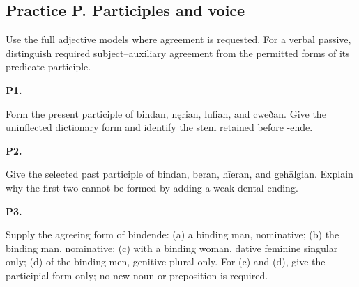 \subsection*{Practice P. Participles and voice}

Use the full adjective models where agreement is requested. For a verbal passive, distinguish required subject–auxiliary agreement from the permitted forms of its predicate participle.

\par\begin{minipage}{\linewidth}\raggedright
\textbf{P1.}

Form the present participle of bindan, nęrian, lufian, and cweðan. Give the uninflected dictionary form and identify the stem retained before -ende.

\end{minipage}\par\addvspace{4pt}

\par\begin{minipage}{\linewidth}\raggedright
\textbf{P2.}

Give the selected past participle of bindan, beran, hīeran, and gehālgian. Explain why the first two cannot be formed by adding a weak dental ending.

\end{minipage}\par\addvspace{4pt}

\par\begin{minipage}{\linewidth}\raggedright
\textbf{P3.}

Supply the agreeing form of bindende: (a) a binding man, nominative; (b) the binding man, nominative; (c) with a binding woman, dative feminine singular only; (d) of the binding men, genitive plural only. For (c) and (d), give the participial form only; no new noun or preposition is required.

\end{minipage}\par\addvspace{4pt}

